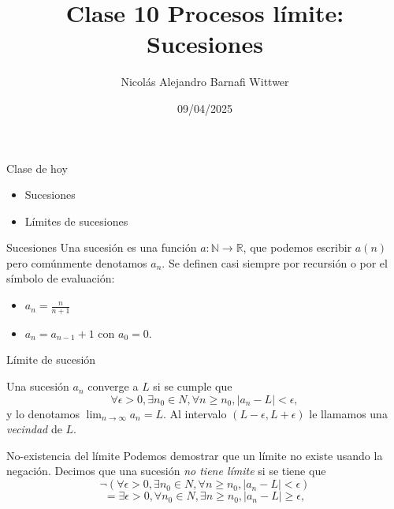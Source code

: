 \documentclass[14pt,aspectratio=169,xcolor=dvipsnames]{beamer}
\title[short title]{Clase 10 Procesos límite: Sucesiones}
\subtitle{}
\author[NA Barnafi] {Nicolás Alejandro Barnafi Wittwer}
\institute[UC|CMM] 
{
    Pontificia Universidad Católica de Chile \\
    Centro de Modelamiento Matemático
}
\date{09/04/2025}
\newcommand{\R}{\mathbb{R}}
\begin{document}
\begin{frame}
    \maketitle
\end{frame}
\begin{frame}{Clase de hoy}
    \begin{itemize}
        \item Sucesiones
        \item Límites de sucesiones
    \end{itemize}

    \vspace{1cm}
\end{frame}
\begin{frame}{Sucesiones}
    Una sucesión es una función $a:\mathbb N\to \R$, que podemos escribir $a(n)$ pero comúnmente denotamos $a_n$. Se definen casi siempre por recursión o por el símbolo de evaluación:
    \begin{itemize}
        \item $a_n = \frac{n}{n+1}$
        \item $a_n = a_{n-1} + 1$ con $a_0 = 0$. 
    \end{itemize}
\end{frame}
\begin{frame}{Límite de sucesión}
    \begin{block}{}
        Una sucesión $a_n$ converge a $L$ si se cumple que
            $$ \forall \epsilon > 0, \exists n_0\in N, \forall n\geq n_0, |a_n - L | < \epsilon, $$
            y lo denotamos $\lim_{n\to\infty} a_n = L$. Al intervalo $(L-\epsilon, L+\epsilon)$ le llamamos una \emph{vecindad} de $L$.
    \end{block}
\end{frame}
\begin{frame}{No-existencia del límite}
    Podemos demostrar que un límite no existe usando la negación. Decimos que una sucesión \emph{no tiene límite} si se tiene que
            $$ \neg(\forall \epsilon > 0, \exists n_0\in N, \forall n\geq n_0, |a_n - L | < \epsilon) $$
            $$ =\exists \epsilon > 0, \forall n_0\in N, \exists n\geq n_0, |a_n - L | \geq \epsilon, $$
\end{frame}
\end{document}
